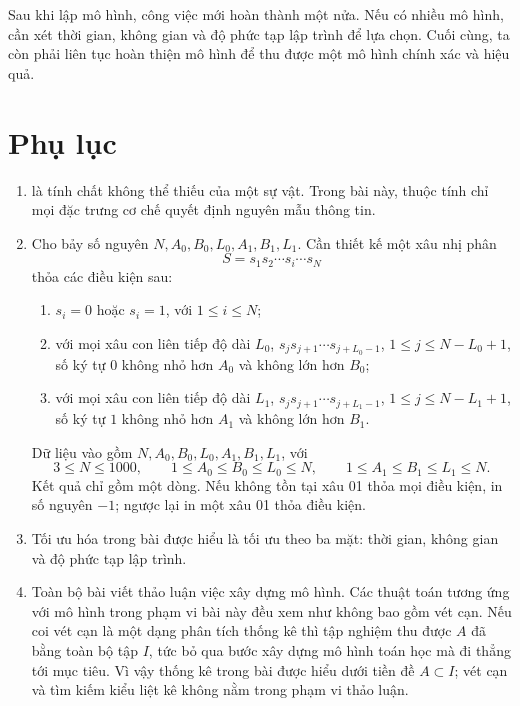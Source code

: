 \documentclass[11pt]{article}
\begin{document}
Sau khi lập mô hình, công việc mới hoàn thành một nửa. Nếu có nhiều mô hình,
cần xét thời gian, không gian và độ phức tạp lập trình để lựa chọn. Cuối cùng,
ta còn phải liên tục hoàn thiện mô hình để thu được một mô hình chính xác và
hiệu quả.

\section*{Phụ lục}

\begin{enumerate}
  \item {} là tính chất không thể thiếu của một sự vật. Trong
  bài này, thuộc tính chỉ mọi đặc trưng cơ chế quyết định nguyên mẫu thông tin.

  \item {} Cho bảy số nguyên
  \(N,A_0,B_0,L_0,A_1,B_1,L_1\). Cần thiết kế một xâu nhị phân
  \[
    S=s_1s_2\cdots s_i\cdots s_N
  \]
  thỏa các điều kiện sau:
  \begin{enumerate}
    \item \(s_i=0\) hoặc \(s_i=1\), với \(1\le i\le N\);
    \item với mọi xâu con liên tiếp độ dài \(L_0\),
    \(s_js_{j+1}\cdots s_{j+L_0-1}\), \(1\le j\le N-L_0+1\), số ký tự \(0\)
    không nhỏ hơn \(A_0\) và không lớn hơn \(B_0\);
    \item với mọi xâu con liên tiếp độ dài \(L_1\),
    \(s_js_{j+1}\cdots s_{j+L_1-1}\), \(1\le j\le N-L_1+1\), số ký tự \(1\)
    không nhỏ hơn \(A_1\) và không lớn hơn \(B_1\).
  \end{enumerate}
  Dữ liệu vào gồm \(N,A_0,B_0,L_0,A_1,B_1,L_1\), với
  \[
    3\le N\le 1000,\qquad
    1\le A_0\le B_0\le L_0\le N,\qquad
    1\le A_1\le B_1\le L_1\le N.
  \]
  Kết quả chỉ gồm một dòng. Nếu không tồn tại xâu 01 thỏa mọi điều kiện, in
  số nguyên \(-1\); ngược lại in một xâu 01 thỏa điều kiện.

  \item Tối ưu hóa trong bài được hiểu là tối ưu theo ba mặt: thời gian, không
  gian và độ phức tạp lập trình.

  \item Toàn bộ bài viết thảo luận việc xây dựng mô hình. Các thuật toán tương
  ứng với mô hình trong phạm vi bài này đều xem như không bao gồm vét cạn. Nếu
  coi vét cạn là một dạng phân tích thống kê thì tập nghiệm thu được \(A\) đã
  bằng toàn bộ tập \(I\), tức bỏ qua bước xây dựng mô hình toán học mà đi thẳng
  tới mục tiêu. Vì vậy thống kê trong bài được hiểu dưới tiền đề \(A\subset I\);
  vét cạn và tìm kiếm kiểu liệt kê không nằm trong phạm vi thảo luận.
\end{enumerate}
\end{document}
